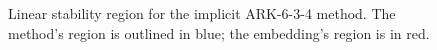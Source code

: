 \documentclass[letterpaper,10pt,english]{sphinxmanual}
\begin{document}
\begin{figure}[htbp]
\caption{Linear stability region for the implicit ARK-6-3-4 method.  The method's
region is outlined in blue; the embedding's region is in red.}\end{figure}
\end{document}
